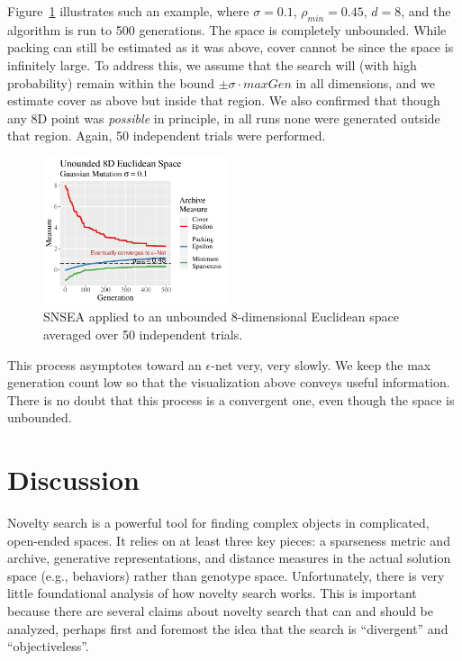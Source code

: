 \documentclass[twoside]{article}
\begin{document}
Figure~\ref{fig:unbounded} illustrates such an example, where $\sigma=0.1$, $\rho_{min}= 0.45$, $d=8$, and the algorithm is run to 500 generations.  The space is completely unbounded.  While packing can still be estimated as it was above, cover cannot be since the space is infinitely large.  To address this, we assume that the search will (with high probability) remain within the bound $\pm\sigma\cdot maxGen$ in all dimensions, and we estimate cover as above but inside that region.  We also confirmed that though any 8D point was \emph{possible} in principle, in all runs none were generated outside that region.  Again, 50 independent trials were performed.
%
\begin{figure}[t]
\includegraphics[width=0.48\textwidth]{Figures/unbounded-r-01-s-045.pdf}
\caption{\label{fig:unbounded} SNSEA applied to an unbounded 8-dimensional Euclidean space averaged over 50 independent trials.}
\end{figure}
%
This process asymptotes toward an $\epsilon$-net very, very slowly.  We keep the max generation count low so that the visualization above conveys useful information.  There is no doubt that this process is a convergent one, even though the space is unbounded.


\section{Discussion}
\label{sec:discussion}

Novelty search is a powerful tool for finding complex objects in complicated, open-ended spaces.  It relies on at least three key pieces:  a sparseness metric and archive, generative representations, and distance measures in the actual solution space (e.g., behaviors) rather than genotype space.  Unfortunately, there is very little foundational analysis of how novelty search works.  This is important because there are several claims about novelty search that can and should be analyzed, perhaps first and foremost the idea that the search is ``divergent'' and ``objectiveless''.  
\end{document}
